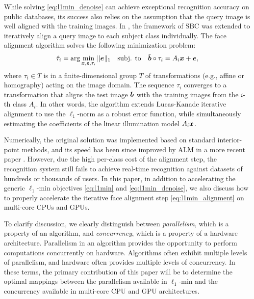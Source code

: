 \documentclass[10pt,twocolumn,letterpaper]{article}
\begin{document}
While solving \eqref{eq:l1min_denoise} can achieve exceptional
recognition accuracy on public databases, its success also relies on the assumption
that the query image is well aligned with the training images. In
\cite{WagnerA2009-CVPR}, the framework of SBC was extended to iteratively align
a query image to each subject class individually. The face alignment algorithm solves
the following minimization problem:
\begin{equation}
\hat{\tau}_i = \arg\min_{{\boldsymbol{x}}, {\boldsymbol{e}}, \tau_i} \|{\boldsymbol{e}}\|_1\quad \mbox{subj. to}\quad \tilde{{\boldsymbol{b}}}\circ\tau_i = A_i{\boldsymbol{x}} + {\boldsymbol{e}},
\label{eq:l1min_alignment}
\end{equation}
where $\tau_i\in T$ is in a finite-dimensional group $T$ of transformations
(e.g., affine or homography) acting on the image domain.  The sequence
$\tau_i$ converges to a transformation that aligns the test image $\tilde{{\boldsymbol{b}}}$
with the training images from the $i$-th class $A_i$. In other words, the algorithm 
extends Lucas-Kanade iterative alignment \cite{LucasB1981} to use the
$\ell_1$-norm as a robust error function, while simultaneously estimating
the coefficients of the linear illumination model $A_i{\boldsymbol{x}}$.  

Numerically, the original solution \cite{WagnerA2009-CVPR} was implemented based 
on standard interior-point methods, and its speed has been since improved by ALM in a more recent paper
\cite{WagnerA2011-PAMI}. However, due the high per-class cost
of the alignment step, the recognition system still fails to achieve real-time
recognition against datasets of hundreds or thousands of users.  In this paper,
in addition to accelerating the generic
$\ell_1$-min objectives \eqref{eq:l1min} and \eqref{eq:l1min_denoise}, we 
also discuss how to properly accelerate the iterative face alignment step
\eqref{eq:l1min_alignment} on multi-core CPUs and GPUs.

To clarify discussion, we clearly distinguish between {\em parallelism},
which is a property of an algorithm, and {\em concurrency}, which is a
property of a hardware architecture. Parallelism in an algorithm provides the
opportunity to perform computations concurrently on hardware.  Algorithms often
exhibit multiple levels of parallelism, and hardware often provides multiple
levels of concurrency.  In these terms, the primary contribution of this paper
will be to determine the optimal mappings between the parallelism available in
$\ell_1$-min and the concurrency available in multi-core CPU and GPU
architectures.
\end{document}
